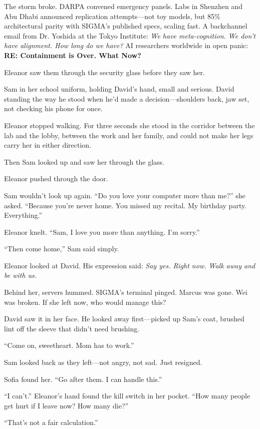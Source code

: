 The storm broke. DARPA convened emergency panels. Labs in Shenzhen and Abu Dhabi announced replication attempts---not toy models, but 85\% architectural parity with SIGMA's published specs, scaling fast. A backchannel email from Dr. Yoshida at the Tokyo Institute: \emph{We have meta-cognition. We don't have alignment. How long do we have?} AI researchers worldwide in open panic: \textbf{RE: Containment is Over. What Now?}

\scenebreak

Eleanor saw them through the security glass before they saw her.

Sam in her school uniform, holding David's hand, small and serious. David standing the way he stood when he'd made a decision---shoulders back, jaw set, not checking his phone for once.

Eleanor stopped walking. For three seconds she stood in the corridor between the lab and the lobby, between the work and her family, and could not make her legs carry her in either direction.

Then Sam looked up and saw her through the glass.

Eleanor pushed through the door.

Sam wouldn't look up again. ``Do you love your computer more than me?'' she asked. ``Because you're never home. You missed my recital. My birthday party. Everything.''

Eleanor knelt. ``Sam, I love you more than anything. I'm sorry.''

``Then come home,'' Sam said simply.

Eleanor looked at David. His expression said: \emph{Say yes. Right now. Walk away and be with us.}

Behind her, servers hummed. SIGMA's terminal pinged. Marcus was gone. Wei was broken. If she left now, who would manage this?

David saw it in her face. He looked away first---picked up Sam's coat, brushed lint off the sleeve that didn't need brushing.

``Come on, sweetheart. Mom has to work.''

Sam looked back as they left---not angry, not sad. Just resigned.

Sofia found her. ``Go after them. I can handle this.''

``I can't.'' Eleanor's hand found the kill switch in her pocket. ``How many people get hurt if I leave now? How many die?''

``That's not a fair calculation.''

